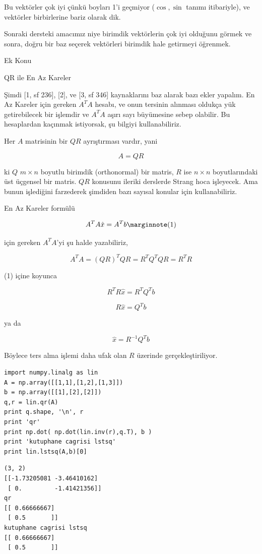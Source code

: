 \documentclass[12pt,fleqn]{article}\usepackage{../../common}
\begin{document}
Bu vektörler çok iyi çünkü boyları 1'i geçmiyor ($\cos,\sin$ tanımı
itibariyle), ve vektörler birbirlerine bariz olarak dik. 

Sonraki dersteki amacımız niye birimdik vektörlerin çok iyi olduğunu görmek
ve sonra, doğru bir baz seçerek vektörleri birimdik hale getirmeyi
öğrenmek. 

Ek Konu

QR ile En Az Kareler 

Şimdi [1, sf 236], [2], ve [3, sf 346] kaynaklarını baz alarak bazı ekler
yapalım. En Az Kareler için gereken $A^TA$ hesabı, ve onun tersinin
alınması oldukça yük getirebilecek bir işlemdir ve $A^TA$ aşırı sayı
büyümesine sebep olabilir. Bu hesaplardan kaçınmak istiyorsak, şu bilgiyi
kullanabiliriz. 

Her $A$ matrisinin bir $QR$ ayrıştırması vardır, yani 

$$ A = QR $$

ki $Q$ $m \times n$ boyutlu birimdik (orthonormal) bir matris, $R$ ise $n
\times n$ boyutlarındaki üst üçgensel bir matris. $QR$ konusunu ileriki
derslerde Strang hoca işleyecek. Ama bunun işlediğini farzederek şimdiden
bazı sayısal konular için kullanabiliriz.

En Az Kareler formülü

$$ 
A^TA \hat{x} = A^Tb 
\mlabel{1} 
$$

için gereken $A^TA$'yi şu halde yazabiliriz,

$$ A^TA = (QR)^TQR = R^TQ^TQR = R^TR $$

(1) içine koyunca

$$ R^TR \hat{x} = R^TQ^Tb $$

$$ R \hat{x} = Q^Tb $$

ya da 

$$ \hat{x} = R^{-1}Q^Tb $$

Böylece ters alma işlemi daha ufak olan $R$ üzerinde gerçekleştiriliyor. 

\begin{verbatim}
import numpy.linalg as lin
A = np.array([[1,1],[1,2],[1,3]])
b = np.array([[1],[2],[2]])
q,r = lin.qr(A)
print q.shape, '\n', r
print 'qr'
print np.dot( np.dot(lin.inv(r),q.T), b )
print 'kutuphane cagrisi lstsq'
print lin.lstsq(A,b)[0]
\end{verbatim}

\begin{verbatim}
(3, 2) 
[[-1.73205081 -3.46410162]
 [ 0.         -1.41421356]]
qr
[[ 0.66666667]
 [ 0.5       ]]
kutuphane cagrisi lstsq
[[ 0.66666667]
 [ 0.5       ]]
\end{verbatim}
\end{document}
